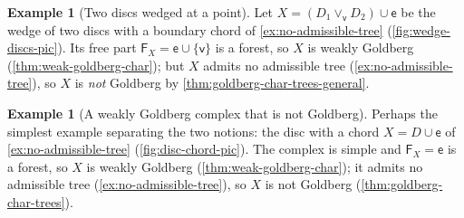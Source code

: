 \documentclass[reqno]{amsart}
\theoremstyle{definition}
\newtheorem{example}[theorem]{Example}
\newcommand\sfF{\mathsf{F}}
\newcommand\sfe{\mathsf{e}}
\newcommand\sfv{\mathsf{v}}
\numberwithin{equation}{section}
\begin{document}
\begin{example}[Two discs wedged at a point]
\label{ex:wedge-discs}
Let \(X=(D_1\vee_\sfv D_2)\cup \sfe\) be the wedge of two discs
with a boundary chord of \cref{ex:no-admissible-tree}
(\cref{fig:wedge-discs-pic}). Its free part
\(\sfF_X=\sfe\cup\{\sfv\}\) is a forest, so \(X\) is weakly
Goldberg (\cref{thm:weak-goldberg-char}); but \(X\) admits no
admissible tree (\cref{ex:no-admissible-tree}), so \(X\) is
\emph{not} Goldberg by \cref{thm:goldberg-char-trees-general}.
\end{example}

\begin{example}[A weakly Goldberg complex that is not Goldberg]
\label{ex:disc-chord}
Perhaps the simplest example separating the two notions: the
disc with a chord \(X=D\cup\sfe\) of
\cref{ex:no-admissible-tree} (\cref{fig:disc-chord-pic}). The
complex is simple and \(\sfF_X=\sfe\) is a forest, so \(X\) is
weakly Goldberg (\cref{thm:weak-goldberg-char}); it admits no
admissible tree (\cref{ex:no-admissible-tree}), so \(X\) is not
Goldberg (\cref{thm:goldberg-char-trees}).
\end{example}
\end{document}
